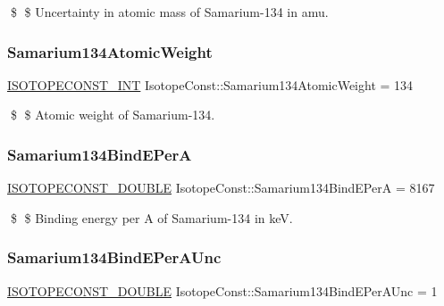 \$ \$ Uncertainty in atomic mass of Samarium-\/134 in amu. \mbox{\label{group___isotope_const-_samarium-_sm134_gaa617bc43677017e6acd11bac8974bc97}} 
\subsubsection{\texorpdfstring{Samarium134\+Atomic\+Weight}{Samarium134AtomicWeight}}
{\footnotesize\ttfamily \mbox{\hyperlink{group___isotope_const-_macros_ga5f18360b3e99483a35c32d789e62621c}{I\+S\+O\+T\+O\+P\+E\+C\+O\+N\+S\+T\+\_\+\+I\+NT}} Isotope\+Const\+::\+Samarium134\+Atomic\+Weight = 134}

\$ \$ Atomic weight of Samarium-\/134. \mbox{\label{group___isotope_const-_samarium-_sm134_gafc7b5c312de3ab2acc0e337d86f7df46}} 
\subsubsection{\texorpdfstring{Samarium134\+Bind\+E\+PerA}{Samarium134BindEPerA}}
{\footnotesize\ttfamily \mbox{\hyperlink{group___isotope_const-_macros_ga8f45a7272ce02c0b4c65c44636ed719a}{I\+S\+O\+T\+O\+P\+E\+C\+O\+N\+S\+T\+\_\+\+D\+O\+U\+B\+LE}} Isotope\+Const\+::\+Samarium134\+Bind\+E\+PerA = 8167}

\$ \$ Binding energy per A of Samarium-\/134 in keV. \mbox{\label{group___isotope_const-_samarium-_sm134_gad374ef0f0360e1d3b42176a2d13efcaa}} 
\subsubsection{\texorpdfstring{Samarium134\+Bind\+E\+Per\+A\+Unc}{Samarium134BindEPerAUnc}}
{\footnotesize\ttfamily \mbox{\hyperlink{group___isotope_const-_macros_ga8f45a7272ce02c0b4c65c44636ed719a}{I\+S\+O\+T\+O\+P\+E\+C\+O\+N\+S\+T\+\_\+\+D\+O\+U\+B\+LE}} Isotope\+Const\+::\+Samarium134\+Bind\+E\+Per\+A\+Unc = 1}

